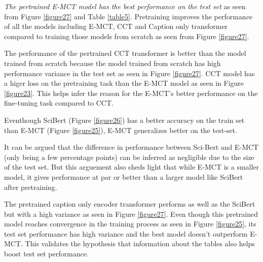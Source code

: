 \textit{The pertrained E-MCT model has the best performance on the test set} as seen from Figure \ref{figure27} and Table \ref{table5}. Pretraining improves the performance of all the models including E-MCT, CCT and Caption only transformer compared to training those models from scratch as seen from Figure \ref{figure27}. 

The performance of the pertrained CCT transformer is better than the model trained from scratch because the model trained from scratch has high performance variance in the test set as seen in Figure \ref{figure27}. CCT model has a higer loss on the pretraining task than the E-MCT model as seen in Figure \ref{figure23}. This helps infer the reason for the E-MCT's better performance on the fine-tuning task compared to CCT. 

Eventhough SciBert (Figure \ref{figure26}) has a better accuracy on the train set than E-MCT (Figure \ref{figure25}), E-MCT generalizes better on the test-set.

It can be argued that the difference in performance between Sci-Bert and E-MCT (only being a few percentage points) can be inferred as negligible due to the size of the test set. But this arguement also sheds light that while E-MCT is a  smaller model, it gives performance at par or better than a larger model like SciBert after pretraining. 

The pretrained caption only encoder transformer performs as well as the SciBert but with a high variance as seen in Figure \ref{figure27}. Even though this pretrained model reaches convergence in the training process as seen in Figure \ref{figure25}, its test set performance has high variance and the best model doesn't outperform E-MCT. This validates the hypothesis that information about the tables also helps boost test set performance. 